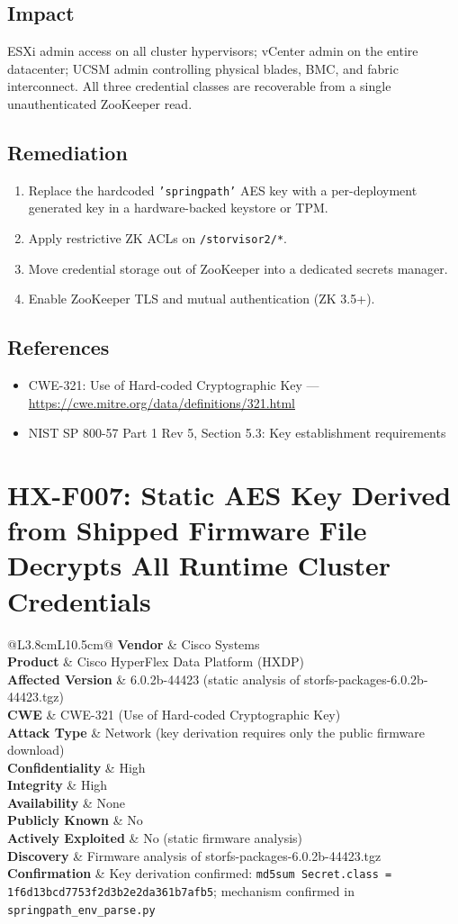 \documentclass[11pt,a4paper]{article}
\makeatletter
\newcommand{\findingmeta}[9]{%
\begin{tabular}{@{}L{3.8cm}L{10.5cm}@{}}
\textbf{Vendor}             & Cisco Systems \\
\textbf{Product}            & Cisco HyperFlex Data Platform (HXDP) \\
\textbf{Affected Version}   & 6.0.2b-44423 (static analysis of storfs-packages-6.0.2b-44423.tgz) \\
\textbf{CWE}                & #1 \\
\textbf{Attack Type}        & #2 \\
\textbf{Confidentiality}    & #3 \\
\textbf{Integrity}          & #4 \\
\textbf{Availability}       & #5 \\
\textbf{Publicly Known}     & #6 \\
\textbf{Actively Exploited} & #7 \\
\textbf{Discovery}          & #8 \\
\textbf{Confirmation}       & #9 \\
\end{tabular}%
}
\makeatother
\begin{document}
\subsection*{Impact}

ESXi admin access on all cluster hypervisors; vCenter admin on the entire
datacenter; UCSM admin controlling physical blades, BMC, and fabric interconnect.
All three credential classes are recoverable from a single unauthenticated
ZooKeeper read.

\subsection*{Remediation}

\begin{enumerate}[noitemsep]
\item Replace the hardcoded \texttt{'springpath'} AES key with a per-deployment
  generated key in a hardware-backed keystore or TPM.
\item Apply restrictive ZK ACLs on \texttt{/storvisor2/*}.
\item Move credential storage out of ZooKeeper into a dedicated secrets manager.
\item Enable ZooKeeper TLS and mutual authentication (ZK 3.5+).
\end{enumerate}

\subsection*{References}

\begin{itemize}[noitemsep]
\item CWE-321: Use of Hard-coded Cryptographic Key ---
  \url{https://cwe.mitre.org/data/definitions/321.html}
\item NIST SP 800-57 Part 1 Rev 5, Section 5.3: Key establishment requirements
\end{itemize}

\bigskip

\section{HX-F007: Static AES Key Derived from Shipped Firmware File Decrypts All Runtime Cluster Credentials}

\findingmeta{CWE-321 (Use of Hard-coded Cryptographic Key)}{Network (key derivation requires only the public firmware download)}{High}{High}{None}{No}{No (static firmware analysis)}{Firmware analysis of storfs-packages-6.0.2b-44423.tgz}{Key derivation confirmed: \texttt{md5sum Secret.class = 1f6d13bcd7753f2d3b2e2da361b7afb5}; mechanism confirmed in \texttt{springpath\_env\_parse.py}}
\end{document}
